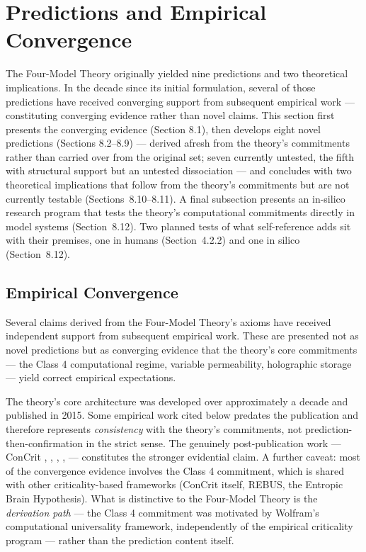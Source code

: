 \documentclass[12pt]{article}
\begin{document}
\section{Predictions and Empirical Convergence}


The Four-Model Theory originally yielded nine predictions \citep{Gruber2015} and two theoretical implications. In the decade since its initial formulation, several of those predictions have received converging support from subsequent empirical work --- constituting converging evidence rather than novel claims. This section first presents the converging evidence (Section 8.1), then develops eight novel predictions (Sections 8.2--8.9) --- derived afresh from the theory's commitments rather than carried over from the original set; seven currently untested, the fifth with structural support but an untested dissociation --- and concludes with two theoretical implications that follow from the theory's commitments but are not currently testable (Sections~8.10--8.11). A final subsection presents an in-silico research program that tests the theory's computational commitments directly in model systems (Section~8.12). Two planned tests of what self-reference adds sit with their premises, one in humans (Section~4.2.2) and one in silico (Section~8.12).


\subsection{Empirical Convergence}


Several claims derived from the Four-Model Theory's axioms have received independent support from subsequent empirical work. These are presented not as novel predictions but as converging evidence that the theory's core commitments --- the Class 4 computational regime, variable permeability, holographic storage --- yield correct empirical expectations.

The theory's core architecture was developed over approximately a decade and published in 2015. Some empirical work cited below predates the publication \citep{Casali2013,CarhartHarris2014} and therefore represents \emph{consistency} with the theory's commitments, not prediction-then-confirmation in the strict sense. The genuinely post-publication work --- ConCrit \citep{AlgomShriki2026}, \citet{HengenShew2025}, \citet{Xu2024}, \citet{Li2025}, \citet{Pinto2017} --- constitutes the stronger evidential claim. A further caveat: most of the convergence evidence involves the Class 4 commitment, which is shared with other criticality-based frameworks (ConCrit itself, REBUS, the Entropic Brain Hypothesis). What is distinctive to the Four-Model Theory is the \emph{derivation path} --- the Class 4 commitment was motivated by Wolfram's computational universality framework, independently of the empirical criticality program --- rather than the prediction content itself.
\end{document}
